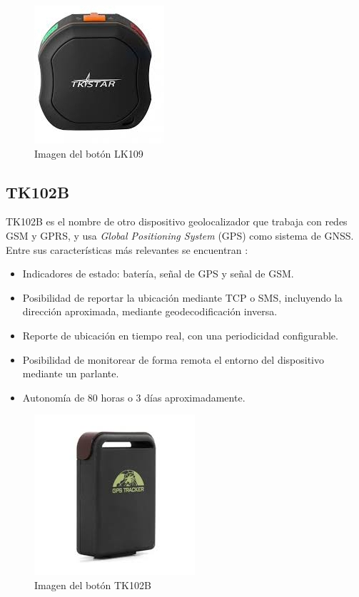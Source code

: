 \begin{figure}[H]
	\centering
	\includegraphics[width=.6\textwidth]{./Figures/lk109.jpg}
	\caption{Imagen del botón LK109}
	\label{fig:texmaker}
\end{figure}

\subsection{TK102B}

TK102B es el nombre de otro dispositivo geolocalizador que trabaja con redes GSM y GPRS, y usa \textit{Global Positioning System} (GPS) como sistema de GNSS. Entre sus características más relevantes se encuentran \citep{TK102BMANUAL:1}:
\begin{itemize}
\item Indicadores de estado: batería, señal de GPS y señal de GSM.
\item Posibilidad de reportar la ubicación mediante TCP o SMS, incluyendo la dirección aproximada, mediante geodecodificación inversa.
\item Reporte de ubicación en tiempo real, con una periodicidad configurable.
\item Posibilidad de monitorear de forma remota el entorno del dispositivo mediante un parlante.
\item Autonomía de 80 horas o 3 días aproximadamente.
\end{itemize}

\begin{figure}[H]
	\centering
	\includegraphics[width=.6\textwidth]{./Figures/tk102b.jpg}
	\caption{Imagen del botón TK102B}
	\label{fig:texmaker}
\end{figure}

